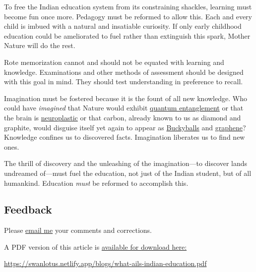 \documentclass[
  a4paper,
]{article}
\begin{document}
To free the Indian education system from its constraining shackles,
learning must become fun once more. Pedagogy must be reformed to allow
this. Each and every child is imbued with a natural and insatiable
curiosity. If only early childhood education could be ameliorated to
fuel rather than extinguish this spark, Mother Nature will do the rest.

Rote memorization cannot and should not be equated with learning and
knowledge. Examinations and other methods of assessment should be
designed with this goal in mind. They should test understanding in
preference to recall.

Imagination must be fostered because it is the fount of all new
knowledge. Who could have \emph{imagined} that Nature would exhibit
\href{http://www.youtube.com/watch?v=0Eeuqh9QfNI\&list=TLlNpED2t9U9sv5MXb2p3Bdqhg2XFcWnBG}{quantum
entanglement} or that the brain is
\href{http://faculty.washington.edu/chudler/plast.html}{neuroplastic} or
that carbon, already known to us as diamond and graphite, would disguise
itself yet again to appear as
\href{http://en.wikipedia.org/wiki/Bucky_balls}{Buckyballs} and
\href{http://www.graphene.manchester.ac.uk/}{graphene}? Knowledge
confines us to discovered facts. Imagination liberates us to find new
ones.

The thrill of discovery and the unleashing of the imagination---to
discover lands undreamed of---must fuel the education, not just of the
Indian student, but of all humankind. Education \emph{must} be reformed
to accomplish this.

\hypertarget{feedback}{%
\subsection{Feedback}\label{feedback}}

Please \href{mailto:feedback.swanlotus@gmail.com}{email me} your
comments and corrections.

\noindent A PDF version of this article is
\href{./what-ails-indian-education.pdf}{available for download here:}

\begin{normalsize}

\begin{ttfamily}

\url{https://swanlotus.netlify.app/blogs/what-ails-indian-education.pdf}

\end{ttfamily}

\end{normalsize}
\end{document}
